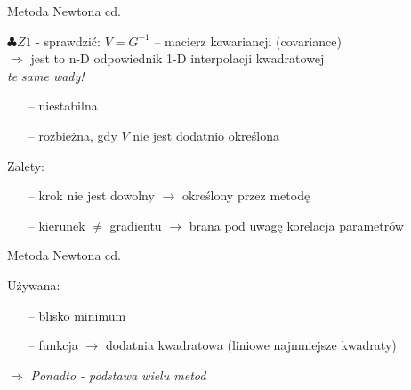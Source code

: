   \begin{frame}{Metoda Newtona cd.}

    \begin{block}{}
      $\clubsuit Z1$ - sprawdzić: $V = G^{-1}$ -- macierz kowariancji (covariance)
      \\$\Rightarrow$ jest to n-D odpowiednik 1-D interpolacji kwadratowej
      \smallskip
	  \\ \emph{te same wady!}
	  \begin{itemize}
	  	\item[--] niestabilna
	  	\item[--] rozbieżna, gdy $V$ nie jest dodatnio określona
	  \end{itemize}
	\end{block}
    \begin{block}{Zalety:}
      \begin{itemize}
	  	\item[--] krok nie jest dowolny $\rightarrow$ określony przez metodę
	  	\item[--] kierunek $\neq$ gradientu $\rightarrow$ brana pod uwagę korelacja parametrów
	  \end{itemize}
	\end{block}

  \end{frame}

  \begin{frame}{Metoda Newtona cd.}

	\begin{block}{Używana:}
      \begin{itemize}
	  	\item[--] blisko minimum
	  	\item[--] funkcja $\rightarrow$ dodatnia kwadratowa (liniowe najmniejsze kwadraty) %
	  \end{itemize}
	\end{block}
	\begin{block}{}
	    $\Rightarrow$ \emph{Ponadto - podstawa wielu metod}
	\end{block}

  \end{frame}

